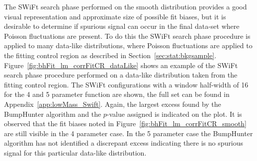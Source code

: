 The SWiFt search phase performed on the smooth distribution provides a good visual representation and approximate size of possible fit biases,
but it is desirable to determine if spurious signal can occur in the final data-set where Poisson fluctuations are present.
To do this the SWiFt search phase procedure is applied to many data-like distributions,
where Poisson fluctuations are applied to the fitting control region as described in Section~\ref{sec:stat:bkgsample}.
Figure~\ref{fig:bhFit_lm_corrFitCR_dataLike} shows an example of the SWiFt search phase procedure performed on a data-like distribution taken from the fitting control region.
The SWiFt configurations with a window half-width of 16 for the 4 and 5 parameter function are shown, the full set can be found in Appendix~\ref{app:lowMass_Swift}.
Again, the largest excess found by the {\sc BumpHunter} algorithm and the \mbox{$p$-value} assigned is indicated on the plot.
It is observed that the fit biases noted in Figure~\ref{fig:bhFit_lm_corrFitCR_smooth} are still visible in the 4 parameter case.
In the 5 parameter case the {\sc BumpHunter} algorithm has not identified a discrepant excess indicating
there is no spurious signal for this particular data-like distribution.

